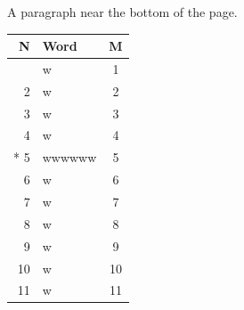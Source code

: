 \documentclass{article}
\begin{document}
\vspace*{18cm}
A paragraph near the bottom of the page.

\begin{longtable}[l]{|r|l|c|}
\hline
N & Word & M \\
\hline
\endhead
\hline
\endfoot
1 & w & 1\\
2 & w & 2\\
3 & w & 3\\
4 & w & 4\\*
5 & wwwwww & 5\\
6 & w & 6\\[4pt]
7 & w & 7\\
\hline\hline
8 & w & 8\\
9 & w & 9\\
10 & w & 10\\
11 & w & 11\\
\end{longtable}
\end{document}

